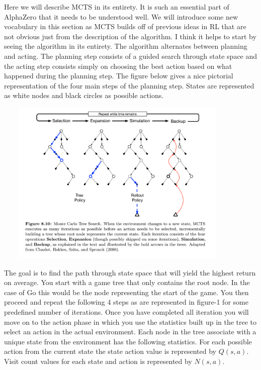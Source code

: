 Here we will describe MCTS in its entirety. It is such an essential part of AlphaZero that it needs to be understood well. We will introduce some new vocabulary in this section as MCTS builds off of previous ideas in RL that are not obvious just from the description of the algorithm. I think it helps to start by seeing the algorithm in its entirety. The algorithm alternates between planning and acting. The planning step consists of a guided search through state space and the acting step consists simply on choosing the best action based on what happened during the planning step. The figure below gives a nice pictorial representation of the four main steps of the planning step. States are represented as white nodes and black circles as possible actions.    

\includegraphics[width=450px,height=300px]{images/mcts}

The goal is to find the path through state space that will yield the highest return on average. You start with a game tree that only contains the root node. In the case of Go this would be the node representing the start of the game. You then proceed and repeat the following 4 steps as are represented in figure-1 for some predefined number of iterations. Once you have completed all iteration you will move on to the action phase in which you use the statistics built up in the tree to select an action in the actual environment. Each node in the tree associate with a unique state from the environment has the following statistics. For each possible action from the current state the state action value is represented by $Q(s,a)$. Visit count values for each state and action is represented by $N(s,a)$.

